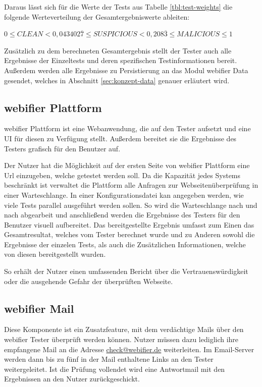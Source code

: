 Daraus lässt sich für die Werte der Tests aus Tabelle \ref{tbl:test-weights} die folgende Werteverteilung der Gesamtergebniswerte ableiten:

\begin{center}
$0 \leq CLEAN < 0,043402\overline{7} \leq SUSPICIOUS < 0,208\overline{3} \leq MALICIOUS \leq 1$
\end{center}

Zusätzlich zu dem berechneten Gesamtergebnis stellt der Tester auch alle Ergebnisse der Einzeltests und deren spezifischen Testinformationen bereit. Außerdem werden alle Ergebnisse zu Persistierung an das Modul webifier Data gesendet, welches in Abschnitt \ref{sec:konzept-data} genauer erläutert wird.

\subsection{webifier Plattform}

webifier Plattform ist eine Webanwendung, die auf den Tester aufsetzt und eine \ac{UI} für diesen zu Verfügung stellt. Außerdem bereitet sie die Ergebnisse des Testers grafisch für den Benutzer auf.

Der Nutzer hat die Möglichkeit auf der ersten Seite von webifier Plattform eine Url einzugeben, welche getestet werden soll. Da die Kapazität jedes Systems beschränkt ist verwaltet die Plattform alle Anfragen zur Webseitenüberprüfung in einer Warteschlange. In einer Konfigurationsdatei kan angegeben werden, wie viele Tests parallel ausgeführt werden sollen. So wird die Warteschlange nach und nach abgearbeit und anschließend werden die Ergebnisse des Testers für den Benutzer visuell aufbereitet. Das bereitgestellte Ergebnis umfasst zum Einen das Gesamtresultat, welches vom Tester berechnet wurde und zu Anderen sowohl die Ergebnisse der einzelen Tests, als auch die Zusätzlichen Informationen, welche von diesen bereitgestellt wurden.

So erhält der Nutzer einen umfassenden Bericht über die Vertrauenswürdigkeit oder die ausgehende Gefahr der überprüften Webseite.

\subsection{webifier Mail}
Diese Komponente ist ein Zusatzfeature, mit dem verdächtige Mails über den webifier Tester überprüft werden können.
Nutzer müssen dazu lediglich ihre empfangene Mail an die Adresse \href{mailto:check@webifier.de}{check@webifier.de} weiterleiten.
Im Email-Server werden dann bis zu fünf in der Mail enthaltene Links an den Tester weitergeleitet.
Ist die Prüfung vollendet wird eine Antwortmail mit den Ergebnissen an den Nutzer zurückgeschickt.

